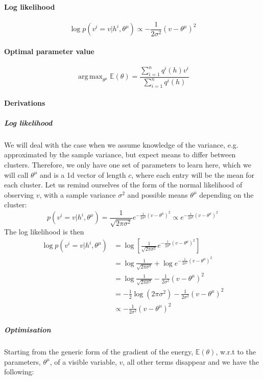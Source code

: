 \documentclass[]{article}
\DeclareMathOperator*{\argmax}{arg\,max}
\begin{document}
\paragraph{Log likelihood}
\[
	\log p(v^i=v|h^i, \theta^{\mu}) \propto -\frac{1}{2\sigma^2}(v - \theta^{\mu})^2
\]
\paragraph{Optimal parameter value}
\[
	\argmax_{\theta^{\mu}} \mathbb{E}(\theta) = \frac{\sum_{i=1}^{n} q^i(h) v^i}{\sum_{i=1}^{n} q^i(h)}
\]

\paragraph{Derivations}

\subparagraph{Log likelihood}
We will deal with the case when we assume knowledge of the variance, e.g. approximated by the sample variance, but expect means to differ between clusters. Therefore, we only have one set of parameters to learn here, which we will call $\theta^{\mu}$ and is a 1d vector of length $c$, where each entry will be the mean for each cluster. Let us remind ourselves of the form of the normal likelihood of observing $v$, with a sample variance $\sigma^2$ and possible means $\theta^{\mu}$ depending on the cluster:
\[
p(v^i=v|h^i, \theta^{\mu}) = \frac{1}{\sqrt{2\pi\sigma^2}} e^{-\frac{1}{2\sigma^2}(v - \theta^{\mu})^2} \propto e^{-\frac{1}{2\sigma^2}(v - \theta^{\mu})^2}
\]
The log likelihood is then
\begin{align*}
	\log p(v^i=v|h^i, \theta^{\mu}) &= \log \left[ \frac{1}{\sqrt{2\pi\sigma^2}} e^{-\frac{1}{2\sigma^2}(v - \theta^{\mu})^2} \right] \\
	&= \log \frac{1}{\sqrt{2\pi\sigma^2}} + \log e^{-\frac{1}{2\sigma^2}(v - \theta^{\mu})^2}  \\
	&=\log \frac{1}{\sqrt{2\pi\sigma^2}} -\frac{1}{2\sigma^2}(v - \theta^{\mu})^2 \\
	&= - \frac{1}{2} \log(2\pi\sigma^2)  -\frac{1}{2\sigma^2}(v - \theta^{\mu})^2 \\
	&\propto -\frac{1}{2\sigma^2}(v - \theta^{\mu})^2
\end{align*}

\subparagraph{Optimisation}

Starting from the generic form of the gradient of the energy, $\mathbb{E}(\theta)$, w.r.t to the parameters, $\theta^{\mu}$, of a visible variable, $v$, all other terms disappear and we have the following:
\end{document}
